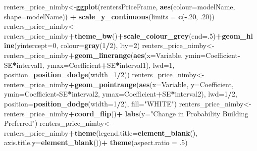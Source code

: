 \documentclass[]{article}
\newenvironment{Shaded}{\begin{snugshade}}{\end{snugshade}}
\newcommand{\DataTypeTok}[1]{\textcolor[rgb]{0.13,0.29,0.53}{#1}}
\newcommand{\DecValTok}[1]{\textcolor[rgb]{0.00,0.00,0.81}{#1}}
\newcommand{\FloatTok}[1]{\textcolor[rgb]{0.00,0.00,0.81}{#1}}
\newcommand{\KeywordTok}[1]{\textcolor[rgb]{0.13,0.29,0.53}{\textbf{#1}}}
\newcommand{\NormalTok}[1]{#1}
\newcommand{\OperatorTok}[1]{\textcolor[rgb]{0.81,0.36,0.00}{\textbf{#1}}}
\newcommand{\StringTok}[1]{\textcolor[rgb]{0.31,0.60,0.02}{#1}}
\begin{document}
\begin{Shaded}
\begin{Highlighting}[]
{\NormalTok{renters_price_nimby<-}\KeywordTok{ggplot}\NormalTok{(rentersPriceFrame, }\KeywordTok{aes}\NormalTok{(}\DataTypeTok{colour=}\NormalTok{modelName, }\DataTypeTok{shape=}\NormalTok{modelName)) }\OperatorTok{+}\StringTok{ }\KeywordTok{scale_y_continuous}\NormalTok{(}\DataTypeTok{limits =} \KeywordTok{c}\NormalTok{(}\OperatorTok{-}\NormalTok{.}\DecValTok{20}\NormalTok{, }\FloatTok{.20}\NormalTok{))}
\NormalTok{renters_price_nimby<-renters_price_nimby}\OperatorTok{+}\KeywordTok{theme_bw}\NormalTok{()}\OperatorTok{+}\KeywordTok{scale_colour_grey}\NormalTok{(}\DataTypeTok{end=}\NormalTok{.}\DecValTok{5}\NormalTok{)}\OperatorTok{+}\KeywordTok{geom_hline}\NormalTok{(}\DataTypeTok{yintercept=}\DecValTok{0}\NormalTok{, }\DataTypeTok{colour=}\KeywordTok{gray}\NormalTok{(}\DecValTok{1}\OperatorTok{/}\DecValTok{2}\NormalTok{), }\DataTypeTok{lty=}\DecValTok{2}\NormalTok{)}
\NormalTok{renters_price_nimby<-renters_price_nimby}\OperatorTok{+}\KeywordTok{geom_linerange}\NormalTok{(}\KeywordTok{aes}\NormalTok{(}\DataTypeTok{x=}\NormalTok{Variable, }\DataTypeTok{ymin=}\NormalTok{Coefficient}\OperatorTok{-}\NormalTok{SE}\OperatorTok{*}\NormalTok{interval1, }
                                                            \DataTypeTok{ymax=}\NormalTok{Coefficient}\OperatorTok{+}\NormalTok{SE}\OperatorTok{*}\NormalTok{interval1), }\DataTypeTok{lwd=}\DecValTok{1}\NormalTok{, }\DataTypeTok{position=}\KeywordTok{position_dodge}\NormalTok{(}\DataTypeTok{width=}\DecValTok{1}\OperatorTok{/}\DecValTok{2}\NormalTok{))}
\NormalTok{renters_price_nimby<-renters_price_nimby}\OperatorTok{+}\KeywordTok{geom_pointrange}\NormalTok{(}\KeywordTok{aes}\NormalTok{(}\DataTypeTok{x=}\NormalTok{Variable, }\DataTypeTok{y=}\NormalTok{Coefficient, }\DataTypeTok{ymin=}\NormalTok{Coefficient}\OperatorTok{-}\NormalTok{SE}\OperatorTok{*}\NormalTok{interval2,}
                                                             \DataTypeTok{ymax=}\NormalTok{Coefficient}\OperatorTok{+}\NormalTok{SE}\OperatorTok{*}\NormalTok{interval2), }\DataTypeTok{lwd=}\DecValTok{1}\OperatorTok{/}\DecValTok{2}\NormalTok{,}
                                                         \DataTypeTok{position=}\KeywordTok{position_dodge}\NormalTok{(}\DataTypeTok{width=}\DecValTok{1}\OperatorTok{/}\DecValTok{2}\NormalTok{), }\DataTypeTok{fill=}\StringTok{"WHITE"}\NormalTok{)}
\NormalTok{renters_price_nimby<-renters_price_nimby}\OperatorTok{+}\KeywordTok{coord_flip}\NormalTok{()}\OperatorTok{+}\StringTok{ }\KeywordTok{labs}\NormalTok{(}\DataTypeTok{y=}\StringTok{"Change in Probability Building Preferred"}\NormalTok{)}
\NormalTok{renters_price_nimby<-renters_price_nimby}\OperatorTok{+}\KeywordTok{theme}\NormalTok{(}\DataTypeTok{legend.title=}\KeywordTok{element_blank}\NormalTok{(), }\DataTypeTok{axis.title.y=}\KeywordTok{element_blank}\NormalTok{())}\OperatorTok{+}\StringTok{ }\KeywordTok{theme}\NormalTok{(}\DataTypeTok{aspect.ratio =} \FloatTok{.5}\NormalTok{)}
}
\end{Highlighting}
\end{Shaded}
\end{document}
